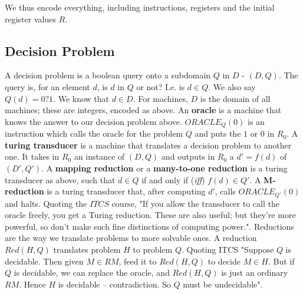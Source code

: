 \documentclass{article}
\begin{document}
We thus encode everything, including instructions, registers and the initial register values $R$.

\subsection{Decision Problem}
A decision problem is a boolean query onto a subdomain $Q$ in $D$ - $(D, Q)$. The query is, for an element $d$, is $d$ in $Q$ or not? I.e. is $d \in Q$. We also say $Q(d) = 0 ? 1$. We know that $d \in D$. For machines, $D$ is the domain of all machines; these are integers, encoded as above.
\vskip 0.1in
An \textbf{oracle} is a machine that knows the answer to our decision problem above. $ORACLE_Q(0)$ is an instruction which calls the oracle for the problem $Q$ and puts the $1$ or $0$ in $R_0$.
\vskip 0.1in
A \textbf{turing transducer} is a machine that translates a decision problem to another one. It takes in $R_0$ an instance of $(D, Q)$ and outputs in $R_0$ a $d' = f(d)$ of $(D', Q')$.
\vskip 0.1in
A \textbf{mapping reduction} or a \textbf{many-to-one reduction} is a turing transducer as above, such that $d \in Q$ if and only if (\textit{iff}) $f(d) \in Q'$.
\vskip 0.1in
A \textbf{M-reduction} is a turing transducer that, after computing $d'$, calls $ORACLE_{Q'}(0)$ and halts. Quoting the $ITCS$ course, "If you allow the transducer to call the oracle freely, you get a Turing reduction.
These are also useful; but they're more powerful, so don't make such fine
distinctions of computing power.".
\vskip 0.1in
Reductions are the way we translate problems to more solvable ones. A reduction $Red(H, Q)$ translates problem $H$ to problem $Q$. Quoting ITCS "Suppose $Q$ is decidable. Then given $M \in RM$, feed it to $Red(H, Q)$
to decide $M \in H$. But if $Q$ is decidable, we can replace the oracle,
and $Red(H, Q)$ is just an ordinary $RM$. Hence $H$ is decidable –
contradiction. So $Q$ must be undecidable".
\vskip 0.1in
\end{document}
